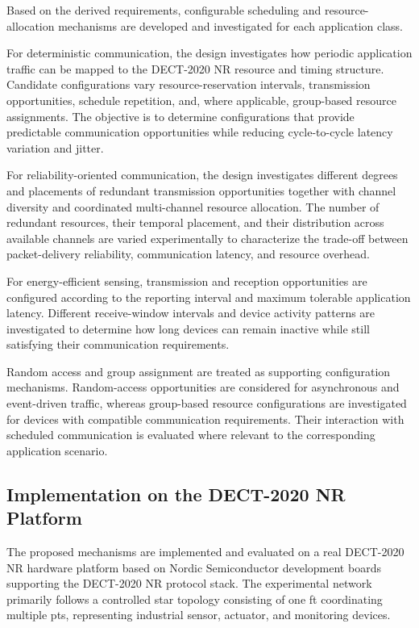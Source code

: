 \documentclass[12pt,a4paper]{article}
\begin{document}
Based on the derived requirements, configurable scheduling and
resource-allocation mechanisms are developed and investigated for each
application class.

For deterministic communication, the design investigates how periodic
application traffic can be mapped to the DECT-2020 NR resource and timing
structure. Candidate configurations vary resource-reservation intervals,
transmission opportunities, schedule repetition, and, where applicable,
group-based resource assignments. The objective is to determine configurations
that provide predictable communication opportunities while reducing
cycle-to-cycle latency variation and jitter.

For reliability-oriented communication, the design investigates different
degrees and placements of redundant transmission opportunities together with
channel diversity and coordinated multi-channel resource allocation. The
number of redundant resources, their temporal placement, and their distribution
across available channels are varied experimentally to characterize the
trade-off between packet-delivery reliability, communication latency, and
resource overhead.

For energy-efficient sensing, transmission and reception opportunities are
configured according to the reporting interval and maximum tolerable
application latency. Different receive-window intervals and device activity
patterns are investigated to determine how long devices can remain inactive
while still satisfying their communication requirements.

Random access and group assignment are treated as supporting configuration
mechanisms. Random-access opportunities are considered for asynchronous and
event-driven traffic, whereas group-based resource configurations are
investigated for devices with compatible communication requirements. Their
interaction with scheduled communication is evaluated where relevant to the
corresponding application scenario.


\subsection{Implementation on the DECT-2020 NR Platform}
\label{subsec:hardware_implementation}

The proposed mechanisms are implemented and evaluated on a real DECT-2020 NR
hardware platform based on Nordic Semiconductor development boards supporting
the DECT-2020 NR protocol stack. The experimental network primarily follows a
controlled star topology consisting of one \gls{ft} coordinating multiple
\glspl{pt}, representing industrial sensor, actuator, and monitoring devices.
\end{document}
